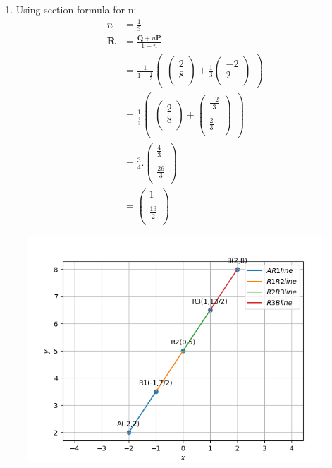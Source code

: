 \documentclass[12pt]{article}
\newcommand{\myvec}[1]{\ensuremath{\begin{pmatrix}#1\end{pmatrix}}}
\let\vec\mathbf
\begin{document}
\begin{enumerate}
\item Using section formula for n:
\begin{align}
n&=\frac{1}{3}\\
\vec{R}&=\frac{\vec{Q}+n\vec{P}}{1+n}\\
&=\frac{1}{1+\frac{1}{3}}  \myvec{\myvec{
2\\
8\\
}
  +
   \frac{1}{3}\myvec{
-2\\
2\\
}}\\
&= \frac{1}{\frac{4}{3}} \myvec{\myvec{
2\\
8\\
}
  +
\myvec{
\frac{-2}{3}\\
\\
\frac{2}{3}\\
}} \\
&=\frac{3}{4}.
\myvec{
\frac{4}{3}\\
\\
\frac{26}{3}\\
}\\
&=\myvec{
1\\
\\
\frac{13}{2}\\
}
\end{align}

\end{enumerate}
\begin{figure}[!h]
\begin{center}
   \includegraphics[width=\columnwidth]{./pics/7.2.9.png}
\end{center}
\caption{}
\label{fig:Fig}
\end{figure}
\end{document}

